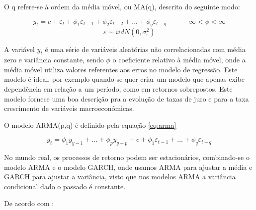 \documentclass[
  12pt,
  a4paper,
  openany]{book}
\begin{document}
O q refere-se à ordem da média móvel, ou MA(q), descrito do seguinte modo:

\begin{equation} 
  y_t =c+\varepsilon_t+\phi_1\varepsilon_{t-1}+\phi_2\varepsilon_{t-2}+...+\phi_q\varepsilon_{t-q}\qquad   -\infty<\phi<\infty 
  \label{eq:ma}
\end{equation}
\begin{equation} 
  \nonumber \varepsilon \sim iid N(0,\sigma_{\epsilon}^{2})
\end{equation}

A variável \(y_t\) é uma série de variáveis aleatórias não correlacionadas com média zero e variância constante, sendo \(\phi\) o coeficiente relativo à média móvel, onde a média móvel utiliza valores referentes aos erros no modelo de regressão. Este modelo é ideal, por exemplo quando se quer criar um modelo que apenas exibe dependência em relação a um período, como em retornos sobrepostos. Este modelo fornece uma boa descrição pra a evolução de taxas de juro e para a taxa crescimento de variáveis macroeconómicas.

O modelo ARMA(p,q) é definido pela equação \eqref{eq:arma}

\begin{equation} 
  y_t =\phi_1y_{y-1}+...+\phi_py_{y-p}+c+\phi_1\varepsilon_{t-1}+...+\phi_q\varepsilon_{t-q}
  \label{eq:arma}
\end{equation}

No mundo real, os processos de retorno podem ser estacionários, combinado-se o modelo ARMA e o modelo GARCH, onde usamos ARMA para ajustar a média e GARCH para ajustar a variância, visto que nos modelos ARMA a variância condicional dado o passado é constante.

De acordo com \citet{oscar}:
\end{document}
